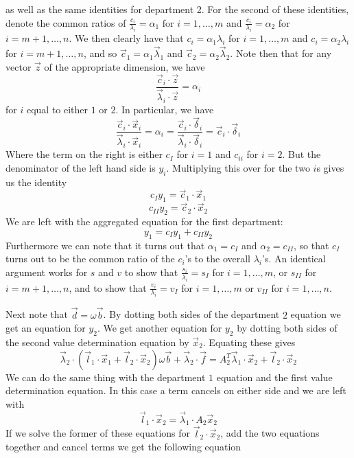 \documentclass{article}
\theoremstyle{definition}
\theoremstyle{plain}
\theoremstyle{theorem}
\begin{document}
as well as the same identities for department 2. For the second of these identities, denote the common ratios of $\frac{c_i}{\lambda_i} = \alpha_1$ for $i=1,\ldots,m$ and $\frac{c_i}{\lambda_i} = \alpha_2$ for $i=m+1,\ldots,n$. We then clearly have that $c_i=\alpha_1 \lambda_i$ for $i=1,\ldots,m$ and $c_i=\alpha_2 \lambda_i$ for $i=m+1,\ldots,n$, and so $\vec{c}_1 = \alpha_1 \vec{\lambda}_1$ and $\vec{c}_2 = \alpha_2 \vec{\lambda}_2$. Note then that for any vector $\vec{z}$ of the appropriate dimension, we have
\[ \frac{\vec{c}_i \cdot \vec{z}}{\vec{\lambda}_i \cdot \vec{z}} = \alpha_i \] 
for $i$ equal to either $1$ or $2$. In particular, we have
\[ \frac{\vec{c}_i \cdot \vec{x}_i}{\vec{\lambda}_i \cdot \vec{x}_i} = \alpha_i = \frac{\vec{c}_i \cdot \vec{\delta}_i}{\vec{\lambda}_i \cdot \vec{\delta}_i} = \vec{c}_i \cdot \vec{\delta}_i \]
Where the term on the right is either $c_I$ for $i=1$ and $c_{ii}$ for $i=2$. But the denominator of the left hand side is $y_i$. Multiplying this over for the two $i$s gives us the identity
\[ c_Iy_1 = \vec{c}_1 \cdot \vec{x}_1 \]
\[ c_{II} y_2 = \vec{c}_2 \cdot \vec{x}_2 \]
We are left with the aggregated equation for the first department:
\begin{equation}
	y_1 = c_I y_1 + c_{II}y_2
\end{equation}
Furthermore we can note that it turns out that $\alpha_1 = c_I$ and $\alpha_2 = c_{II}$, so that $c_I$ turns out to be the common ratio of the $c_i$'s to the overall $\lambda_i$'s. An identical argument works for $s$ and $v$ to show that $\frac{s_i}{\lambda_i}=s_I$ for $i=1,\ldots,m$, or $s_{II}$ for $i=m+1,\ldots,n$, and to show that $\frac{v_i}{\lambda_i}=v_I$ for $i=1,\ldots,m$ or $v_{II}$ for $i=1,\ldots,n$. \par 
Next note that $\vec{d} = \omega \vec{b}$. By dotting both sides of the department $2$ equation we get an equation for $y_2$. We get another equation for $y_2$ by dotting both sides of the second value determination equation by $\vec{x}_2$. Equating these gives
\[ \vec{\lambda}_2 \cdot (\vec{l}_1 \cdot \vec{x}_1 + \vec{l}_2 \cdot \vec{x}_2)\omega\vec{b} + \vec{\lambda}_2 \cdot \vec{f} = A_2^T \vec{\lambda}_1 \cdot \vec{x}_2 + \vec{l}_2 \cdot \vec{x}_2 \]
We can do the same thing with the department $1$ equation and the first value determination equation. In this case a term cancels on either side and we are left with 
\[ \vec{l}_1 \cdot \vec{x}_2 = \vec{\lambda}_1 \cdot A_2 \vec{x}_2 \]
If we solve the former of these equations for $\vec{l}_2 \cdot \vec{x}_2$, add the two equations together and cancel terms we get the following equation
\end{document}
